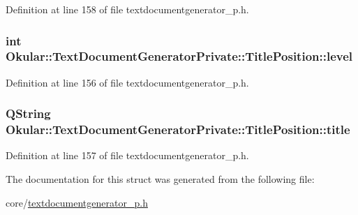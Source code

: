 Definition at line 158 of file textdocumentgenerator\+\_\+p.\+h.

\hypertarget{structOkular_1_1TextDocumentGeneratorPrivate_1_1TitlePosition_a3891ca8e5a5a2bee40c86c45c28580f2}{
\subsubsection[{level}]{\setlength{\rightskip}{0pt plus 5cm}int Okular\+::\+Text\+Document\+Generator\+Private\+::\+Title\+Position\+::level}}\label{structOkular_1_1TextDocumentGeneratorPrivate_1_1TitlePosition_a3891ca8e5a5a2bee40c86c45c28580f2}


Definition at line 156 of file textdocumentgenerator\+\_\+p.\+h.

\hypertarget{structOkular_1_1TextDocumentGeneratorPrivate_1_1TitlePosition_a8e6e5b071bbeee14a07badecc0cd45d6}{
\subsubsection[{title}]{\setlength{\rightskip}{0pt plus 5cm}Q\+String Okular\+::\+Text\+Document\+Generator\+Private\+::\+Title\+Position\+::title}}\label{structOkular_1_1TextDocumentGeneratorPrivate_1_1TitlePosition_a8e6e5b071bbeee14a07badecc0cd45d6}


Definition at line 157 of file textdocumentgenerator\+\_\+p.\+h.



The documentation for this struct was generated from the following file\+:\begin{DoxyCompactItemize}
\item 
core/\hyperlink{textdocumentgenerator__p_8h}{textdocumentgenerator\+\_\+p.\+h}\end{DoxyCompactItemize}
